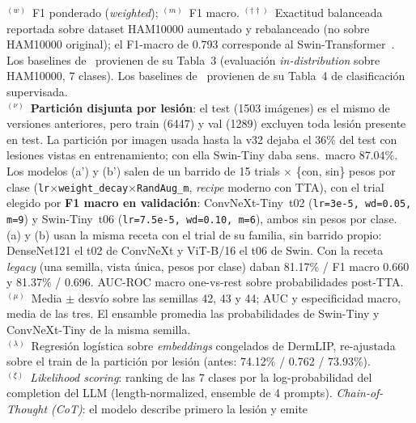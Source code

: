 \begin{table}[htbp]
{\begin{tabular}{@{}llccrrrrr@{}}
\bottomrule
\end{tabular}%
}
\vspace{4pt}
\begin{minipage}{\textwidth}
  \footnotesize
  $^{(w)}$~F1 ponderado (\textit{weighted}); $^{(m)}$~F1 macro.
  $^{(\dagger\dagger)}$~Exactitud balanceada reportada sobre dataset HAM10000
  aumentado y rebalanceado (no sobre HAM10000 original);
  el F1-macro de 0.793 corresponde al Swin-Transformer~\cite{SkinSavvy22025}.\\
  Los baselines de~\cite{SkinR12025} provienen de su Tabla~3
  (evaluación \textit{in-distribution} sobre HAM10000, 7 clases).
  Los baselines de~\cite{MMSkin2025} provienen de su Tabla~4 de clasificación supervisada.\\
  $^{(\nu)}$~\textbf{Partición disjunta por lesión}: el test (1503 imágenes) es el mismo de versiones
  anteriores, pero train (6447) y val (1289) excluyen toda lesión presente en test. La partición por
  imagen usada hasta la v32 dejaba el 36\% del test con lesiones vistas en entrenamiento; con ella Swin-Tiny
  daba sens.\ macro 87.04\%. Los modelos (a') y (b') salen de un barrido de 15 trials
  $\times$ \{con, sin\} pesos por clase (\texttt{lr}$\times$\texttt{weight\_decay}$\times$\texttt{RandAug\_m},
  \textit{recipe} moderno con TTA), con el trial elegido por \textbf{F1 macro en validación}:
  ConvNeXt-Tiny~t02 (\texttt{lr=3e-5, wd=0.05, m=9}) y Swin-Tiny~t06 (\texttt{lr=7.5e-5, wd=0.10, m=6}),
  ambos sin pesos por clase. (a) y (b) usan la misma receta con el trial de su familia, sin barrido propio:
  DenseNet121 el t02 de ConvNeXt y ViT-B/16 el t06 de Swin. Con la receta \textit{legacy} (una semilla, vista
  única, pesos por clase) daban 81.17\% / F1 macro 0.660 y 81.37\% / 0.696. AUC-ROC macro one-vs-rest sobre
  probabilidades post-TTA.\\[4pt]
  $^{(\mu)}$~Media $\pm$ desvío sobre las semillas 42, 43 y 44; AUC y especificidad macro, media de las
  tres. El ensamble promedia las probabilidades de Swin-Tiny y ConvNeXt-Tiny de la misma semilla.\\[4pt]
  $^{(\lambda)}$~Regresión logística sobre \textit{embeddings} congelados de DermLIP, re-ajustada sobre el
  train de la partición por lesión (antes: 74.12\% / 0.762 / 73.93\%).\\[4pt]
  $^{(\xi)}$~\textit{Likelihood scoring}: ranking de las 7 clases por la log-probabilidad
  del completion del LLM (length-normalized, ensemble de 4 prompts).
  \textit{Chain-of-Thought (CoT)}: el modelo describe primero la lesión y emite

\end{minipage}
\end{table}
